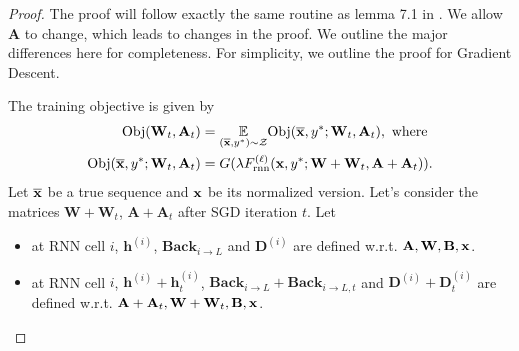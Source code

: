 \begin{proof}
	The proof will follow exactly the same routine as lemma 7.1 in \cite{allen2019can}. We allow $\mathbf{A}$ to change, which leads to changes in the proof. We outline the major differences here for completeness. For simplicity, we outline the proof for Gradient Descent.
	
	The training objective is given by
	\begin{align*}
		\mathrm{Obj}( \mathbf{W}_{t},  \mathbf{A}_t) &= \underset{\left(\overline{\mathbf{x}}, y^{\ast}\right) \sim \mathcal{Z}}{\mathbb{E}} \mathrm{Obj}(\overline{\mathbf{x}}, y^{\ast};  \mathbf{W}_{t},  \mathbf{A}_t),\text{ where } \\
		\mathrm{Obj}(\overline{\mathbf{x}}, y^{\ast};  \mathbf{W}_{t},  \mathbf{A}_t) &= G(\lambda F^{(\ell)}_{\mathrm{rnn}}(\mathbf{x}, y^{\ast};  \mathbf{W} + \mathbf{W}_{t},  \mathbf{A} + \mathbf{A}_t)).
	\end{align*}
	Let $\overline{\mathbf{x}}$ be a true sequence and $\mathbf{x}$ be its normalized version. Let's consider the matrices $\mathbf{W}+\mathbf{W}_t$, $\mathbf{A}+\mathbf{A}_t$ after SGD iteration $t$. Let
	\begin{itemize}
		\item  at RNN cell $i$,  $\mathbf{h}^{(i)}$,  $\mathbf{Back}_{i \to L}$ and  $\mathbf{D}^{(i)}$ are defined w.r.t. $\mathbf{A}, \mathbf{W}, \mathbf{B}, \mathbf{x}$.
		\item at RNN cell $i$,  $\mathbf{h}^{(i)} + \mathbf{h}^{(i)}_t$,  $\mathbf{Back}_{i \to L} + \mathbf{Back}_{i \to L, t}$ and  $\mathbf{D}^{(i)} + \mathbf{D}^{(i)}_t$ are defined w.r.t. $\mathbf{A} + \mathbf{A}_t, \mathbf{W} + \mathbf{W}_t, \mathbf{B}, \mathbf{x}$.
	\end{itemize}
	

\end{proof}
